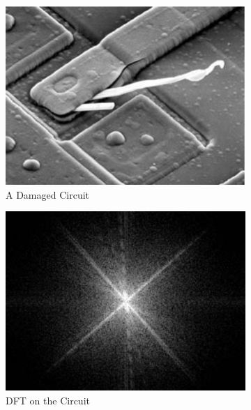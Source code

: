 \documentclass{amsproc}
\begin{document}
\begin{figure}[h]
\centering
\begin{subfigure}{.3\textwidth}
	\centering
	\includegraphics[scale=.32]{dftimage1.png}
	\caption{A Damaged Circuit}
	\label{fig:sub8}
\end{subfigure} %
\begin{subfigure}{.3\textwidth}
	\centering
	\includegraphics[scale=.32]{dftimage2.png}
	\caption{DFT on the Circuit}
	\label{fig:sub9}
\end{subfigure} %
\begin{subfigure}{.3\textwidth}
	\centering

\end{subfigure}
\end{figure}
\end{document}
